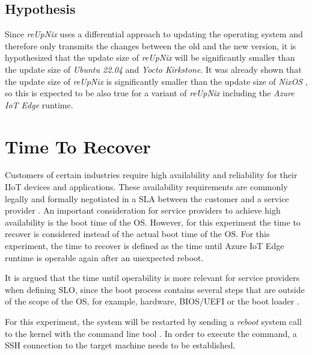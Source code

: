 \subsection{Hypothesis}

Since \textit{reUpNix} uses a differential approach to updating the operating
system and therefore only transmits the changes between the old and the new
version, it is hypothesized that the update size of \textit{reUpNix} will be
significantly smaller than the update size of \textit{Ubuntu 22.04} and
\textit{Yocto Kirkstone}. It was already shown that the update size of
\textit{reUpNix} is significantly smaller than the update size of \textit{NixOS}
\cite{gollenstede:23:lctes}, so this is expected to be also true for a variant
of \textit{reUpNix} including the \textit{Azure IoT Edge} runtime.

\section{Time To Recover}
\label{sec:time-to-recover}
Customers of certain industries require high availability and reliability for
their \ac{IIoT} devices and applications. These availability requirements
are commonly legally and formally negotiated in a \ac{SLA} between
the customer and a service provider \cite{msdoc-slas}. An important consideration
for service providers to achieve high availability is the boot time of the
\ac{OS}. However, for this experiment the time to recover is considered
instead of the actual boot time of the \ac{OS}. For this experiment, the time to recover
is defined as the time until Azure IoT Edge runtime is operable again after
an unexpected reboot.

It is argued that the time until operability is more relevant for service providers
when defining \ac{SLO}, since the boot process contains several steps that are
outside of the scope of the \ac{OS}, for example, hardware, BIOS/UEFI or the boot
loader \cite{almesberg}.

For this experiment, the system will be restarted by sending a \textit{reboot} system
call to the kernel with the  command line tool \cite{man-reboot}.
In order to execute the command, a \ac{SSH} connection to the target machine
needs to be established.

\clearpage

